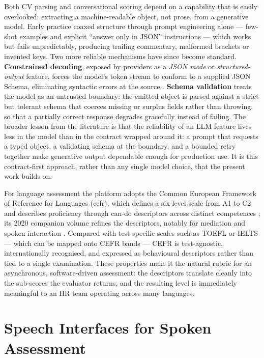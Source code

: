 Both CV parsing and conversational scoring depend on a capability that is
easily overlooked: extracting a machine-readable object, not prose, from a
generative model. Early practice coaxed structure through prompt engineering
alone --- few-shot examples and explicit ``answer only in JSON''
instructions --- which works but fails unpredictably, producing trailing
commentary, malformed brackets or invented keys. Two more reliable
mechanisms have since become standard. \textbf{Constrained decoding}, exposed
by providers as a \emph{JSON mode} or \emph{structured-output} feature, forces
the model's token stream to conform to a supplied JSON Schema, eliminating
syntactic errors at the source \parencite{OpenAIStructured2024}.
\textbf{Schema validation} treats the model as an untrusted boundary: the
emitted object is parsed against a strict but tolerant schema that coerces
missing or surplus fields rather than throwing, so that a partially correct
response degrades gracefully instead of failing. The broader lesson from the
literature is that the reliability of an LLM feature lives less in the model
than in the contract wrapped around it: a prompt that requests a typed object,
a validating schema at the boundary, and a bounded retry together make
generative output dependable enough for production use. It is this
contract-first approach, rather than any single model choice, that the present
work builds on.

For language assessment the platform adopts the Common European Framework of
Reference for Languages (\gls{cefr}), which defines a six-level scale from A1
to C2 and describes proficiency through can-do descriptors across distinct
competences \parencite{CEFR2001}; its 2020 companion volume refines the
descriptors, notably for mediation and spoken interaction
\parencite{CEFRCompanion2020}. Compared with test-specific scales such as
TOEFL or IELTS --- which can be mapped onto CEFR bands --- CEFR is
test-agnostic, internationally recognised, and expressed as behavioural
descriptors rather than tied to a single examination. These properties make
it the natural rubric for an asynchronous, software-driven assessment: the
descriptors translate cleanly into the sub-scores the evaluator returns, and
the resulting level is immediately meaningful to an HR team operating across
many languages.


\section{Speech Interfaces for Spoken Assessment}
\label{sec:sota-speech}

